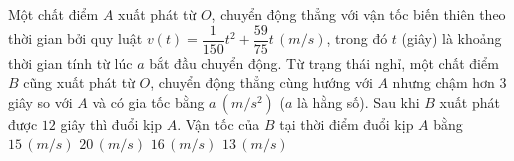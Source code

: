 \begin{ex}%
    Một chất điểm $A$ xuất phát từ $O$, chuyển động thẳng với vận tốc biến thiên theo thời gian bởi quy luật $v\left(t \right)=\dfrac{1}{150}t^2+\dfrac{59}{75}t\,\left(m/s \right)$, trong đó $t$ (giây) là khoảng thời gian tính từ lúc $a$ bắt đầu chuyển động. Từ trạng thái nghỉ, một chất điểm $B$ cũng xuất phát từ $O$, chuyển động thẳng cùng hướng với $A$ nhưng chậm hơn $3$ giây so với $A$ và có gia tốc bằng $a\,\left(m/s^2 \right)$ ($a$ là hằng số). Sau khi $B$ xuất phát được $12$ giây thì đuổi kịp $A$. Vận tốc của $B$ tại thời điểm đuổi kịp $A$ bằng
    \choice
    {$15\,\left(m/s \right)$}
    {$20\,\left(m/s \right)$}
    {\True $16\,\left(m/s \right)$}
    {$13\,\left(m/s \right)$}
\end{ex}

